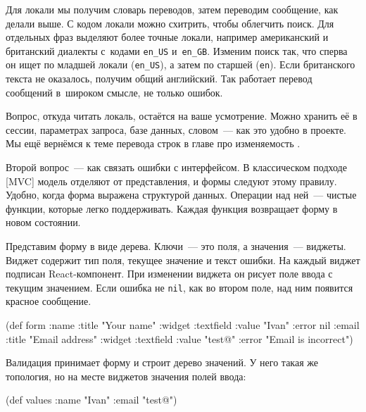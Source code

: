 \fi


Для локали мы получим словарь переводов, затем переводим сообщение, как делали
выше. С кодом локали можно схитрить, чтобы облегчить поиск. Для отдельных фраз
выделяют более точные локали, например американский и британский диалекты
с~кодами \verb|en_US| и~\verb|en_GB|. Изменим поиск так, что сперва он ищет по
младшей локали (\verb|en_US|), а затем по старшей (\verb|en|). Если британского
текста не оказалось, получим общий английский. Так работает перевод сообщений
в~широком смысле, не только ошибок.

Вопрос, откуда читать локаль, остаётся на ваше усмотрение. Можно хранить её в
сессии, параметрах запроса, базе данных, словом~--- как это удобно в проекте. Мы
ещё вернёмся к теме перевода строк в главе про изменяемость .

Второй вопрос~--- как связать ошибки с интерфейсом. В классическом подходе
[MVC]
модель отделяют от представления, и формы следуют этому правилу. Удобно, когда
форма выражена структурой данных. Операции над ней~--- чистые функции,
которые легко поддерживать. Каждая функция возвращает форму в новом состоянии.

Представим форму в виде дерева. Ключи~--- это поля, а значения~---
виджеты. Виджет содержит тип поля, текущее значение и текст ошибки. На каждый
виджет подписан React-компонент. При изменении виджета он рисует поле ввода с
текущим значением. Если ошибка не \verb|nil|, как во втором поле, над ним
появится красное сообщение.

\begin{english}
  \begin{clojure}
(def form
  {:name {:title "Your name"
          :widget :textfield
          :value "Ivan"
          :error nil}
   :email {:title "Email address"
           :widget :textfield
           :value "test@"
           :error "Email is incorrect"}})
  \end{clojure}
\end{english}

Валидация принимает форму и строит дерево значений. У него такая же топология, но
на месте виджетов значения полей ввода:

\begin{english}
  \begin{clojure}
(def values
  {:name "Ivan"
   :email "test@"})
  \end{clojure}
\end{english}

